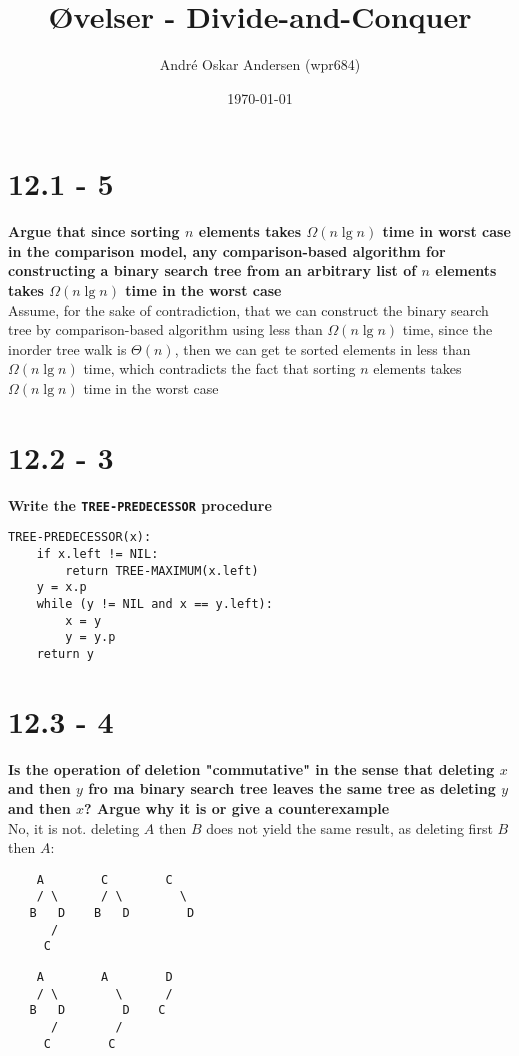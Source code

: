 \documentclass{report}
\title{Øvelser - Divide-and-Conquer}
\author{André Oskar Andersen (wpr684)}
\date{\today}
\begin{document}
\maketitle

\section*{12.1 - 5}
\textbf{Argue that since sorting $n$ elements takes $\Omega(n \lg n)$ time in worst case in the comparison model, any comparison-based algorithm for constructing a binary search tree from an arbitrary list of $n$ elements takes $\Omega(n \lg n)$ time in the worst case} \\
Assume, for the sake of contradiction, that we can construct the binary search tree by comparison-based algorithm using less than $\Omega(n \lg n)$ time, since the inorder tree walk is $\Theta(n)$, then we can get te sorted elements in less than $\Omega(n \lg n)$ time, which contradicts the fact that sorting $n$ elements takes $\Omega(n \lg n)$ time in the worst case

\section*{12.2 - 3}
\textbf{Write the \texttt{TREE-PREDECESSOR} procedure}
\begin{verbatim}
TREE-PREDECESSOR(x):
    if x.left != NIL:
        return TREE-MAXIMUM(x.left)
    y = x.p
    while (y != NIL and x == y.left):
        x = y
        y = y.p
    return y
\end{verbatim}

\section*{12.3 - 4}
\textbf{Is the operation of deletion "commutative" in the sense that deleting $x$ and then $y$ fro ma binary search tree leaves the same tree as deleting $y$ and then $x$? Argue why it is or give a counterexample} \\
No, it is not. deleting $A$ then $B$ does not yield the same result, as deleting first $B$ then $A$:
\begin{verbatim}
    A        C        C
    / \      / \        \
   B   D    B   D        D
      /
     C
\end{verbatim}

\begin{verbatim}
    A        A        D
    / \        \      /
   B   D        D    C
      /        /
     C        C   
\end{verbatim}
\end{document}
